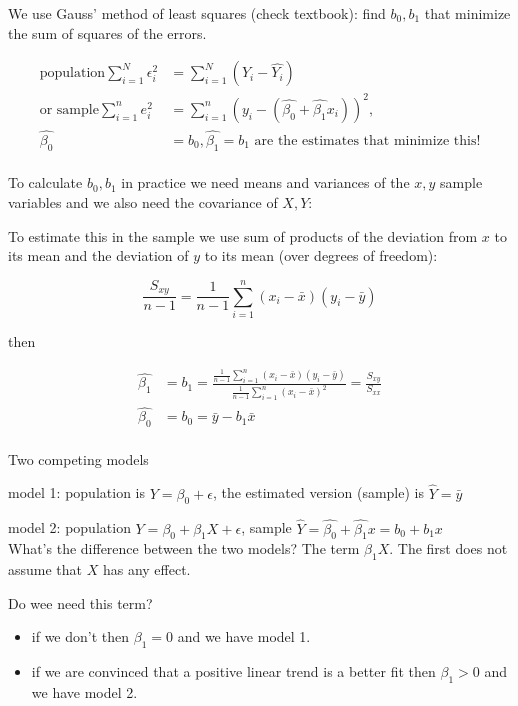 \documentclass[a4paper, 11pt, twoside]{article}
\begin{document}
We use Gauss' method of least squares (check textbook): find $b_0, b_1$ that minimize the sum of squares of the errors.

\[
\begin{split}
	\text{population} \sum^N_{i=1}\epsilon_i^2 &= \sum^N_{i=1}(Y_i - \hat{Y_i}) \\
	\text{or sample} \sum^n_{i=1}e_i^2 &= \sum^n_{i=1}(y_i - (\hat{\beta_0}+\hat{\beta_1}x_i))^2	, \\\hat{\beta_0}&=b_0, \hat{\beta_1}=b_1 \text{ are the estimates that minimize this!}
\end{split}
\]
\\

To calculate $b_0, b_1$ in practice we need means and variances of the $x, y$ sample variables and we also need the covariance of $X, Y$:

To estimate this in the sample we use sum of products of the deviation from $x$ to its mean and the deviation of $y$ to its mean (over degrees of freedom): 

\[ \frac{S_{xy}}{n-1} = \frac{1}{n-1}\sum^n_{i=1}(x_i - \bar{x})(y_i-\bar{y})\]

then

\[
\begin{split}
	\hat{\beta_1} &= b_1 = \frac{\frac{1}{n-1}\sum^n_{i=1}(x_i-\bar{x})(y_i-\bar{y})}{\frac{1}{n-1}\sum^n_{i=1}(x_i-\bar{x})^2} = \frac{S_{xy}}{S_{xx}} \\	
	\hat{\beta_0} &= b_0 = \bar{y} - b_1\bar{x}
\end{split}
\]
\\

Two competing models

model 1: population is $Y = \beta_0 + \epsilon$, the estimated version (sample) is $\hat{Y} = \bar{y}$

model 2: population $Y = \beta_0 + \beta_1X+\epsilon$, sample $\hat{Y} = \hat{\beta_0} + \hat{\beta_1}x = b_0+b_1x$
\\

What's the difference between the two models? The term $\beta_1X$. The first does not assume that $X$ has any effect.

Do wee need this term?

\begin{itemize}
	\item if we don't then $\beta_1=0$ and we have model 1.
	\item if we are convinced that a positive linear trend is a better fit then $\beta_1 > 0$ and we have model 2.
\end{itemize}
\end{document}
